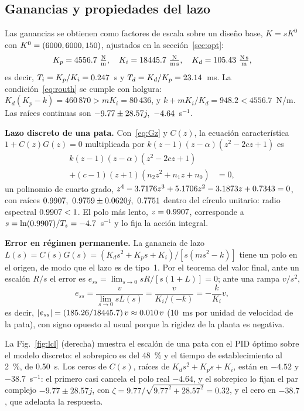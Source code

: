 \documentclass[conference]{IEEEtran}
\begin{document}
\subsection{Ganancias y propiedades del lazo}

Las ganancias se obtienen como factores de escala sobre un diseño base, $K = sK^0$ con $K^0 = (6000, 6000, 150)$, ajustados en la sección~\ref{sec:opt}:
\begin{equation}
K_p = \KpOpt\ \tfrac{\text{N}}{\text{m}},\quad K_i = \KiOpt\ \tfrac{\text{N}}{\text{m\,s}},\quad K_d = \KdOpt\ \tfrac{\text{N\,s}}{\text{m}},
\end{equation}
es decir, $T_i = K_p/K_i = 0.247$~s y $T_d = K_d/K_p = 23.14$~ms. La condición~\eqref{eq:routh} se cumple con holgura: $K_d(K_p - k) = 460\,870 > mK_i = 80\,436$, y $k + mK_i/K_d = 948.2 < 4556.7$~N/m. Las raíces continuas son $-9.77 \pm 28.57j,\allowbreak\ -4.64$~s$^{-1}$.

\textbf{Lazo discreto de una pata.} Con~\eqref{eq:Gz} y $C(z)$, la ecuación característica $1 + C(z)G(z) = 0$ multiplicada por $k(z - 1)(z - \alpha)(z^2 - 2cz + 1)$ es
\begin{equation}
\begin{split}
k(z - 1)(z - \alpha)(z^2 - 2cz + 1)&\\ + (c - 1)(z + 1)(n_2z^2 + n_1z + n_0) &= 0 ,
\end{split}
\end{equation}
un polinomio de cuarto grado, $z^4 -3.7176z^3 +5.1706z^2 -3.1873z +0.7343 = 0$, con raíces $0.9907,\allowbreak\ 0.9759 \pm 0.0620j,\allowbreak\ 0.7751$ dentro del círculo unitario: radio espectral $0.9907 < 1$. El polo más lento, $z = 0.9907$, corresponde a $s = \ln(0.9907)/T_s = -4.7$~s$^{-1}$ y lo fija la acción integral.

\textbf{Error en régimen permanente.} La ganancia de lazo $L(s) = C(s)G(s) = (K_ds^2 + K_ps + K_i)/[s(ms^2 - k)]$ tiene un polo en el origen, de modo que el lazo es de tipo~1. Por el teorema del valor final, ante un escalón $R/s$ el error es $e_{ss} = \lim_{s\to0}sR/[s(1 + L)] = 0$; ante una rampa $v/s^2$,
\begin{equation}
e_{ss} = \frac{v}{\lim_{s\to0}sL(s)} = \frac{v}{K_i/(-k)} = -\frac{k}{K_i}v ,
\end{equation}
es decir, $|e_{ss}| = (185.26/18445.7)\,v \approx 0.010\,v$ (10~ms por unidad de velocidad de la pata), con signo opuesto al usual porque la rigidez de la planta es negativa.

La Fig.~\ref{fig:lcl} (derecha) muestra el escalón de una pata con el PID óptimo sobre el modelo discreto: el sobrepico es del 48~\% y el tiempo de establecimiento al 2~\%, de 0.50~s. Los ceros de $C(s)$, raíces de $K_ds^2 + K_ps + K_i$, están en $-4.52$ y $-38.7$~s$^{-1}$: el primero casi cancela el polo real $-4.64$, y el sobrepico lo fijan el par complejo $-9.77 \pm 28.57j$, con $\zeta = 9.77/\sqrt{9.77^2 + 28.57^2} = 0.32$, y el cero en $-38.7$, que adelanta la respuesta.
\end{document}

